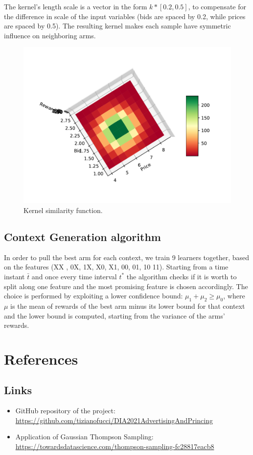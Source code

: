 \documentclass[12pt,a4paper]{report}
\begin{document}
The kernel's length scale is a vector in the form $k*[0.2, 0.5]$, to compensate for the difference in scale of the input variables (bids are spaced by 0.2, while prices are spaced by 0.5). The resulting kernel makes each sample have symmetric influence on neighboring arms.
\begin{figure}[H]
\centering
  \includegraphics[scale = 0.7, center]{Kernel_dim}
  \caption{Kernel similarity function.}
\end{figure}
\section{Context Generation algorithm}
In order to pull the best arm for each context, we train  9 learners together, based on the features (XX , 0X, 1X, X0, X1, 00, 01, 10 11). 
Starting from a time instant $\bar t$ and once every time interval $t^*$ the algorithm checks if it is worth to split along one feature and   
the most promising feature is chosen accordingly. The choice is performed by exploiting a lower confidence bound: $\mu_1 + \mu_2 \geq \mu_0$, where $\mu$ is the mean of rewards of the best arm minus its lower bound for that context and the lower bound is computed, starting from the variance of the arms' rewards.


	\chapter{References}
		\label{chap:ref}
		\section{Links}

\begin{itemize}
	\item GitHub repository of the project: \url{https://github.com/tizianofucci/DIA2021AdvertisingAndPrincing}
	\item Application of Gaussian Thompson Sampling: \url{https://towardsdatascience.com/thompson-sampling-fc28817eacb8}
\end{itemize}
\end{document}
